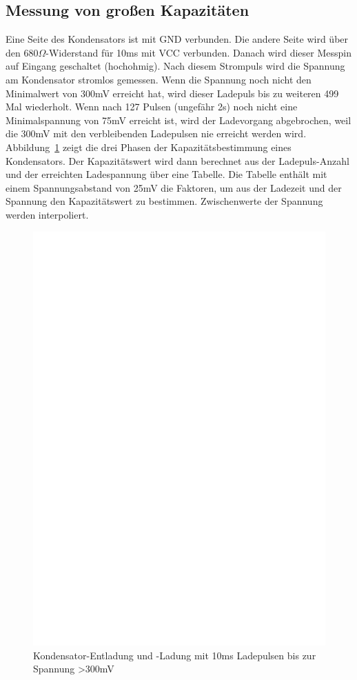 \subsection{Messung von großen Kapazitäten}
\label{sec:bigcap}
Eine Seite des Kondensators ist mit GND verbunden. Die andere Seite wird über den \(680\Omega\)-Widerstand für 10ms mit VCC verbunden.
Danach wird dieser Messpin auf Eingang geschaltet (hochohmig).
Nach diesem Strompuls wird die Spannung am Kondensator stromlos gemessen.
Wenn die Spannung noch nicht den Minimalwert von 300mV erreicht hat, wird dieser Ladepuls bis zu weiteren 499 Mal wiederholt.
Wenn nach 127 Pulsen (ungefähr 2s) noch nicht eine Minimalspannung von 75mV erreicht ist, wird der Ladevorgang abgebrochen,
 weil die 300mV mit den verbleibenden Ladepulsen nie erreicht werden wird.
Abbildung~\ref{fig:bigcap1} zeigt die drei Phasen der Kapazitätsbestimmung eines Kondensators.
Der Kapazitätswert wird dann berechnet aus der Ladepuls-Anzahl und der erreichten Ladespannung über eine Tabelle.
Die Tabelle enthält mit einem Spannungsabstand von 25mV die Faktoren, um aus der Ladezeit und der Spannung 
den Kapazitätswert zu bestimmen. 
Zwischenwerte der Spannung werden interpoliert.

\begin{figure}[H]
\centering
\includegraphics[]{../FIG/Bigcap.eps}
\caption{Kondensator-Entladung und -Ladung mit 10ms Ladepulsen bis zur Spannung \textgreater 300mV}
\label{fig:bigcap1}
\end{figure}

